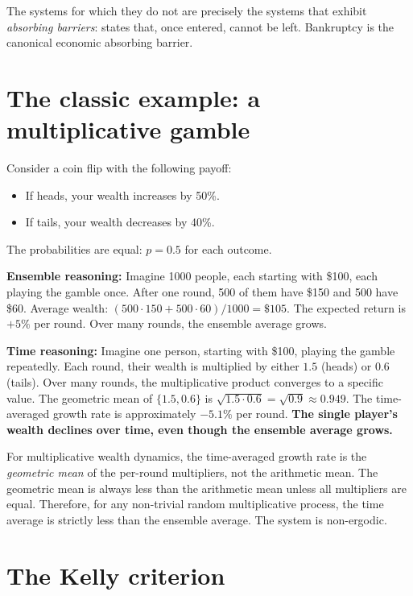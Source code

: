 \documentclass[11pt,a4paper]{book}
\theoremstyle{cleanrm}
\begin{document}
The systems for which they do not are precisely the systems that
exhibit \emph{absorbing barriers}: states that, once entered, cannot
be left. Bankruptcy is the canonical economic absorbing barrier.

\section{The classic example: a multiplicative gamble}

Consider a coin flip with the following payoff:

\begin{itemize}[leftmargin=2em]
    \item If heads, your wealth increases by 50\%.
    \item If tails, your wealth decreases by 40\%.
\end{itemize}

The probabilities are equal: $p = 0.5$ for each outcome.

\textbf{Ensemble reasoning:} Imagine 1000 people, each starting with
\$100, each playing the gamble once. After one round, 500 of them have
\$150 and 500 have \$60. Average wealth: $(500 \cdot 150 + 500 \cdot
60)/1000 = \$105$. The expected return is $+5\%$ per round. Over
many rounds, the ensemble average grows.

\textbf{Time reasoning:} Imagine one person, starting with \$100,
playing the gamble repeatedly. Each round, their wealth is multiplied
by either $1.5$ (heads) or $0.6$ (tails). Over many rounds, the
multiplicative product converges to a specific value. The geometric
mean of $\{1.5, 0.6\}$ is $\sqrt{1.5 \cdot 0.6} = \sqrt{0.9} \approx
0.949$. The time-averaged growth rate is approximately $-5.1\%$ per
round. \textbf{The single player's wealth declines over time, even
though the ensemble average grows.}

\begin{conceptbox}
For multiplicative wealth dynamics, the time-averaged growth rate is
the \emph{geometric mean} of the per-round multipliers, not the
arithmetic mean. The geometric mean is always less than the arithmetic
mean unless all multipliers are equal. Therefore, for any non-trivial
random multiplicative process, the time average is strictly less than
the ensemble average. The system is non-ergodic.
\end{conceptbox}

\section{The Kelly criterion}
\end{document}
